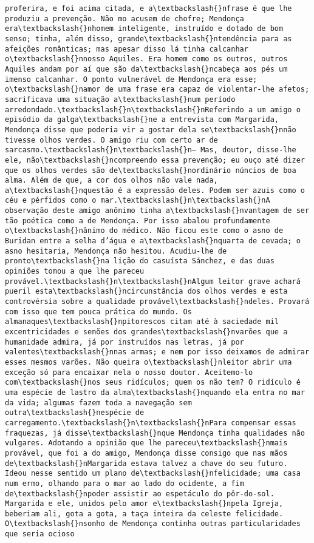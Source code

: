 \documentclass[11pt]{article}
\begin{document}
\begin{Verbatim}[commandchars=\\\{\}]
proferira, e foi acima citada, e a\textbackslash{}nfrase é que lhe produziu a prevenção. Não mo acusem de chofre; Mendonça era\textbackslash{}nhomem inteligente, instruído e dotado de bom senso; tinha, além disso, grande\textbackslash{}ntendência para as afeições românticas; mas apesar disso lá tinha calcanhar o\textbackslash{}nnosso Aquiles. Era homem como os outros, outros Aquiles andam por aí que são da\textbackslash{}ncabeça aos pés um imenso calcanhar. O ponto vulnerável de Mendonça era esse; o\textbackslash{}namor de uma frase era capaz de violentar-lhe afetos; sacrificava uma situação a\textbackslash{}num período arredondado.\textbackslash{}n\textbackslash{}nReferindo a um amigo o episódio da galga\textbackslash{}ne a entrevista com Margarida, Mendonça disse que poderia vir a gostar dela se\textbackslash{}nnão tivesse olhos verdes. O amigo riu com certo ar de sarcasmo.\textbackslash{}n\textbackslash{}n— Mas, doutor, disse-lhe ele, não\textbackslash{}ncompreendo essa prevenção; eu ouço até dizer que os olhos verdes são de\textbackslash{}nordinário núncios de boa alma. Além de que, a cor dos olhos não vale nada, a\textbackslash{}nquestão é a expressão deles. Podem ser azuis como o céu e pérfidos como o mar.\textbackslash{}n\textbackslash{}nA observação deste amigo anônimo tinha a\textbackslash{}nvantagem de ser tão poética como a de Mendonça. Por isso abalou profundamente o\textbackslash{}nânimo do médico. Não ficou este como o asno de Buridan entre a selha d’água e a\textbackslash{}nquarta de cevada; o asno hesitaria, Mendonça não hesitou. Acudiu-lhe de pronto\textbackslash{}na lição do casuísta Sánchez, e das duas opiniões tomou a que lhe pareceu provável.\textbackslash{}n\textbackslash{}nAlgum leitor grave achará pueril esta\textbackslash{}ncircunstância dos olhos verdes e esta controvérsia sobre a qualidade provável\textbackslash{}ndeles. Provará com isso que tem pouca prática do mundo. Os almanaques\textbackslash{}npitorescos citam até à saciedade mil excentricidades e senões dos grandes\textbackslash{}nvarões que a humanidade admira, já por instruídos nas letras, já por valentes\textbackslash{}nnas armas; e nem por isso deixamos de admirar esses mesmos varões. Não queira o\textbackslash{}nleitor abrir uma exceção só para encaixar nela o nosso doutor. Aceitemo-lo com\textbackslash{}nos seus ridículos; quem os não tem? O ridículo é uma espécie de lastro da alma\textbackslash{}nquando ela entra no mar da vida; algumas fazem toda a navegação sem outra\textbackslash{}nespécie de carregamento.\textbackslash{}n\textbackslash{}nPara compensar essas fraquezas, já disse\textbackslash{}nque Mendonça tinha qualidades não vulgares. Adotando a opinião que lhe pareceu\textbackslash{}nmais provável, que foi a do amigo, Mendonça disse consigo que nas mãos de\textbackslash{}nMargarida estava talvez a chave do seu futuro. Ideou nesse sentido um plano de\textbackslash{}nfelicidade; uma casa num ermo, olhando para o mar ao lado do ocidente, a fim de\textbackslash{}npoder assistir ao espetáculo do pôr-do-sol. Margarida e ele, unidos pelo amor e\textbackslash{}npela Igreja, beberiam ali, gota a gota, a taça inteira da celeste felicidade. O\textbackslash{}nsonho de Mendonça continha outras particularidades que seria ocioso 
\end{Verbatim}
\end{document}
